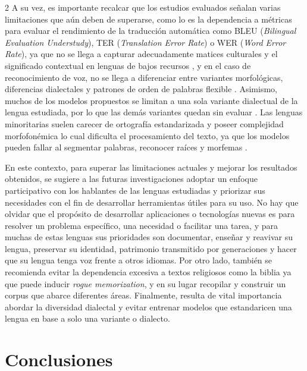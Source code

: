 \documentclass[12pt,twoside,titlepage]{ingenius}
\begin{document}
\begin{multicols}{2}
A su vez, es importante recalcar que los estudios evaluados señalan varias limitaciones que aún deben de superarse, como lo es la dependencia a métricas para evaluar el rendimiento de la traducción automática como BLEU (\textit{Bilingual Evaluation Understudy}), TER (\textit{Translation Error Rate}) o WER (\textit{Word Error Rate}), ya que no se llega a capturar adecuadamente matices culturales y el significado contextual en lenguas de bajos recursos \cite{Park2025}, y en el caso de reconocimiento de voz, no se llega a diferenciar entre variantes morfológicas, diferencias dialectales y patrones de orden de palabras flexible \cite{Akallouch2025}. 
Asimismo, muchos de los modelos propuestos se limitan a una sola  variante dialectual de la lengua estudiada, por lo que las demás variantes quedan sin evaluar \cite{Park2025, Santiago-Benito2025, Akallouch2025}. Las lenguas minoritarias suelen carecer de ortografía estandarizada y poseer complejidad morfofonémica lo cual dificulta el procesamiento del texto, ya que los modelos pueden fallar al segmentar palabras, reconocer raíces y morfemas \cite{Liu2022, Manimaran2024, Vallejo-Huanga2026, Akallouch2025}.

En este contexto, para superar las limitaciones actuales y mejorar los resultados obtenidos, se sugiere a las futuras investigaciones adoptar un enfoque participativo con los hablantes de las lenguas estudiadas y priorizar sus necesidades con el fin de desarrollar herramientas útiles para su uso. No hay que olvidar que el propósito de desarrollar aplicaciones o tecnologías nuevas es para resolver un problema específico, una necesidad o facilitar una tarea, y para muchas de estas lenguas sus prioridades son documentar, enseñar y reavivar su lengua, preservar su identidad, patrimonio transmitido por generaciones y hacer que su lengua tenga voz frente a otros idiomas. Por otro lado, también se recomienda evitar la dependencia excesiva a textos religiosos como la biblia ya que puede inducir \textit{rogue memorization}, y en su lugar recopilar y construir un corpus que abarce diferentes áreas. Finalmente, resulta de vital importancia abordar la diversidad dialectal y evitar entrenar modelos que estandaricen una lengua en base a solo una variante o dialecto.


\section{Conclusiones}


\end{multicols}
\end{document}
